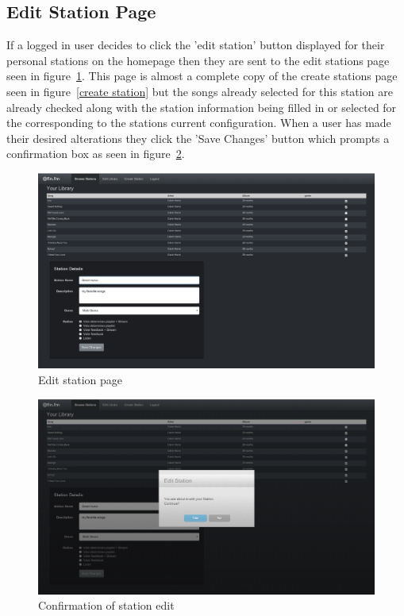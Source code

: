 \documentclass[a4paper, 12pt]{report}
\begin{document}
\subsection{Edit Station Page}
If a logged in user decides to click the 'edit station' button displayed for their personal stations on the homepage then they are sent to the edit stations page seen in figure~\ref{edit-station}. This page is almost a complete copy of the create stations page seen in figure~\ref{create station} but the songs already selected for this station are already checked along with the station information being filled in or selected for the corresponding to the stations current configuration. 
When a user has made their desired alterations they click the 'Save Changes' button which prompts a confirmation box as seen in figure~\ref{edit-station-confirm}.
\begin{figure}[H]
  \centering
    \includegraphics[width=1.0\textwidth]{screenshots/edit-station.png}
    \caption{Edit station page}
    \label{edit-station}
\end{figure}
\begin{figure}[H]
  \centering
    \includegraphics[width=1.0\textwidth]{screenshots/edit-station-confirm.png}
    \caption{Confirmation of station edit}
    \label{edit-station-confirm}
\end{figure}
\end{document}
